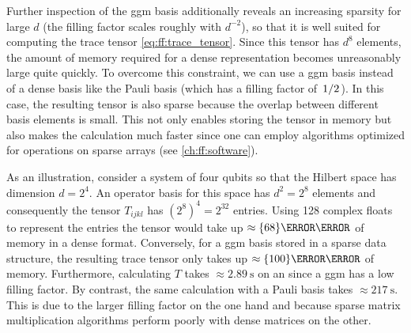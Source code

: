 Further inspection of the \gls{ggm} basis additionally reveals an increasing sparsity for large $d$ (the filling factor scales roughly with $d^{-2}$), so that it is well suited for computing the trace tensor \cref{eq:ff:trace_tensor}.
Since this tensor has $d^8$ elements, the amount of memory required for a dense representation becomes unreasonably large quite quickly.
To overcome this constraint, we can use a \gls{ggm} basis instead of a dense basis like the Pauli basis (which has a filling factor of $\flatfrac{1}{2}$).
In this case, the resulting tensor is also sparse because the overlap between different basis elements is small.
This not only enables storing the tensor in memory but also makes the calculation much faster since one can employ algorithms optimized for operations on sparse arrays (see \cref{ch:ff:software}).

As an illustration, consider a system of four qubits so that the Hilbert space has dimension $d = 2^4$.
An operator basis for this space has $d^2 = 2^8$ elements and consequently the tensor $T_{ijkl}$ has $(2^8)^4 = 2^{32}$ entries.
Using \qty{128}{\bit} complex floats to represent the entries the tensor would take up $\approx\qty{68}{\giga\byte}$ of memory in a dense format.
Conversely, for a \gls{ggm} basis stored in a sparse data structure, the resulting trace tensor only takes up $\approx\qty{100}{\mega\byte}$ of memory.
Furthermore, calculating $T$ takes $\approx\qty{2.89}{\second}$ on an \fastprocessor since a \gls{ggm} has a low filling factor.
By contrast, the same calculation with a Pauli basis takes $\approx\qty{217}{\second}$.
This is due to the larger filling factor on the one hand and because sparse matrix multiplication algorithms perform poorly with dense matrices on the other.

